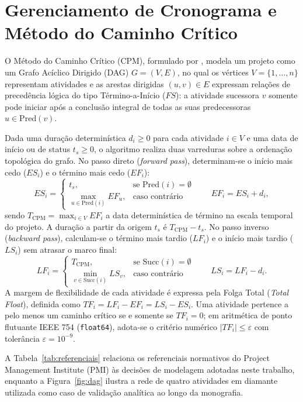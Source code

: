 \documentclass[12pt,openany,oneside,a4paper,english,brazilian,sumario=tradicional]{abntex2}
\begin{document}
\section{Gerenciamento de Cronograma e Método do Caminho Crítico}

O Método do Caminho Crítico (CPM), formulado por , modela um projeto como um Grafo Acíclico Dirigido (DAG) $G=(V,E)$, no qual os vértices $V=\{1,\dots,n\}$ representam atividades e as arestas dirigidas $(u,v)\in E$ expressam relações de precedência lógica do tipo Término-a-Início ($FS$): a atividade sucessora $v$ somente pode iniciar após a conclusão integral de todas as suas predecessoras $u \in \mathrm{Pred}(v)$.

Dada uma duração determinística $d_i \ge 0$ para cada atividade $i \in V$ e uma data de início ou de status $t_s \ge 0$, o algoritmo realiza duas varreduras sobre a ordenação topológica do grafo. No passo direto (\textit{forward pass}), determinam-se o início mais cedo ($ES_i$) e o término mais cedo ($EF_i$):
\begin{equation}
ES_i=\begin{cases}t_s,&\text{se }\mathrm{Pred}(i)=\emptyset\\ \max_{u\in \mathrm{Pred}(i)}EF_u,&\text{caso contrário}\end{cases}\qquad EF_i=ES_i+d_i,
\end{equation}
sendo $T_{\mathrm{CPM}}=\max_{i\in V}EF_i$ a data determinística de término na escala temporal do projeto. A duração a partir da origem $t_s$ é $T_{\mathrm{CPM}}-t_s$. No passo inverso (\textit{backward pass}), calculam-se o término mais tardio ($LF_i$) e o início mais tardio ($LS_i$) sem atrasar o marco final:
\begin{equation}
LF_i=\begin{cases}T_{\mathrm{CPM}},&\text{se }\mathrm{Succ}(i)=\emptyset\\ \min_{v\in\mathrm{Succ}(i)}LS_v,&\text{caso contrário}\end{cases}\qquad LS_i=LF_i-d_i.
\end{equation}
A margem de flexibilidade de cada atividade é expressa pela Folga Total (\textit{Total Float}), definida como $TF_i=LF_i-EF_i=LS_i-ES_i$. Uma atividade pertence a pelo menos um caminho crítico se e somente se $TF_i=0$; em aritmética de ponto flutuante IEEE 754 (\texttt{float64}), adota-se o critério numérico $|TF_i| \le \varepsilon$ com tolerância $\varepsilon=10^{-9}$.

A Tabela~\ref{tab:referenciais} relaciona os referenciais normativos do Project Management Institute (PMI) às decisões de modelagem adotadas neste trabalho, enquanto a Figura~\ref{fig:dag} ilustra a rede de quatro atividades em diamante utilizada como caso de validação analítica ao longo da monografia.
\end{document}
